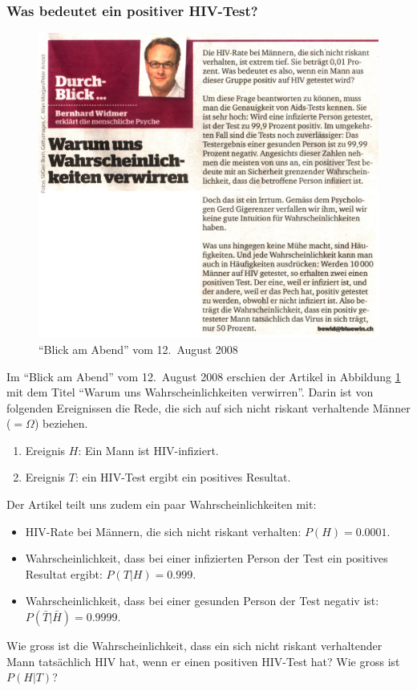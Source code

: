 \subsubsection{Was bedeutet ein positiver HIV-Test?}
\begin{figure}
\begin{center}
\includegraphics[width=\hsize]{graphics/aids-300}
\end{center}
\caption{``Blick am Abend'' vom 12.~August 2008\label{aids}}
\end{figure}
Im ``Blick am Abend'' vom 12.~August 2008 erschien der Artikel in Abbildung 
\ref{aids} mit dem Titel ``Warum uns Wahrscheinlichkeiten verwirren''.
Darin ist von folgenden Ereignissen die Rede, die sich auf sich nicht riskant
verhaltende Männer ($=\Omega$) beziehen.
\begin{enumerate}
\item Ereignis $H$: Ein Mann ist HIV-infiziert.
\item Ereignis $T$: ein HIV-Test ergibt ein positives Resultat.
\end{enumerate}
Der Artikel teilt uns zudem ein paar Wahrscheinlichkeiten mit:
\begin{itemize}
\item HIV-Rate bei Männern, die sich nicht riskant verhalten:
$P(H)=0.0001$.
\item Wahrscheinlichkeit, dass bei einer infizierten Person der Test
ein positives Resultat ergibt: $P(T|H)=0.999$.
\item Wahrscheinlichkeit, dass bei einer gesunden Person der Test negativ
ist: $P(\bar T|\bar H)=0.9999$.
\end{itemize}
Wie gross ist die Wahrscheinlichkeit, dass ein sich nicht riskant verhaltender
Mann tatsächlich HIV hat, wenn er einen positiven HIV-Test hat? Wie
gross ist $P(H|T)$?

